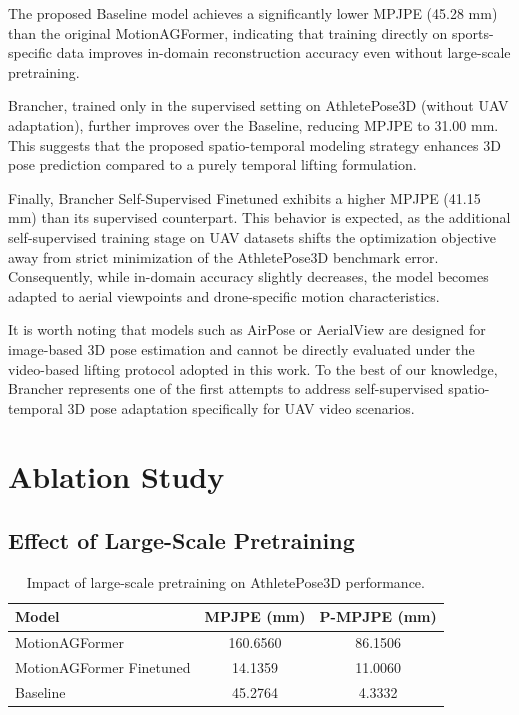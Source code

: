 The proposed Baseline model achieves a significantly lower MPJPE (45.28 mm) than the original MotionAGFormer, indicating that training directly on sports-specific data improves in-domain reconstruction accuracy even without large-scale pretraining.

Brancher, trained only in the supervised setting on AthletePose3D (without UAV adaptation), further improves over the Baseline, reducing MPJPE to 31.00 mm. This suggests that the proposed spatio-temporal modeling strategy enhances 3D pose prediction compared to a purely temporal lifting formulation.

Finally, Brancher Self-Supervised Finetuned exhibits a higher MPJPE (41.15 mm) than its supervised counterpart. This behavior is expected, as the additional self-supervised training stage on UAV datasets shifts the optimization objective away from strict minimization of the AthletePose3D benchmark error. Consequently, while in-domain accuracy slightly decreases, the model becomes adapted to aerial viewpoints and drone-specific motion characteristics.

It is worth noting that models such as AirPose \cite{saini2022airpose} or AerialView \cite{hwang2024aerial} are designed for image-based 3D pose estimation and cannot be directly evaluated under the video-based lifting protocol adopted in this work. To the best of our knowledge, Brancher represents one of the first attempts to address self-supervised spatio-temporal 3D pose adaptation specifically for UAV video scenarios.

\section{Ablation Study}
\subsection{Effect of Large-Scale Pretraining}

\begin{table}[H]
\centering
\caption{Impact of large-scale pretraining on AthletePose3D performance.}
\label{tab:results_pretraining}
\begin{tabular}{lcc}
\hline
Model & MPJPE (mm) & P-MPJPE (mm) \\
\hline
MotionAGFormer & 160.6560 & 86.1506 \\
MotionAGFormer Finetuned & 14.1359 & 11.0060 \\
Baseline & 45.2764 & 4.3332 \\
\hline
\end{tabular}
\end{table}

